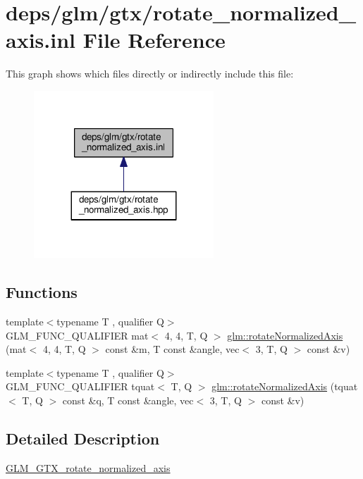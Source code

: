 \hypertarget{rotate__normalized__axis_8inl}{}\section{deps/glm/gtx/rotate\+\_\+normalized\+\_\+axis.inl File Reference}
\label{rotate__normalized__axis_8inl}
This graph shows which files directly or indirectly include this file\+:
\nopagebreak
\begin{figure}[H]
\begin{center}
\leavevmode
\includegraphics[width=191pt]{d0/df2/rotate__normalized__axis_8inl__dep__incl}
\end{center}
\end{figure}
\subsection*{Functions}
\begin{DoxyCompactItemize}
\item 
{\footnotesize template$<$typename T , qualifier Q$>$ }\\G\+L\+M\+\_\+\+F\+U\+N\+C\+\_\+\+Q\+U\+A\+L\+I\+F\+I\+ER mat$<$ 4, 4, T, Q $>$ \hyperlink{group__gtx__rotate__normalized__axis_ga50efd7ebca0f7a603bb3cc11e34c708d}{glm\+::rotate\+Normalized\+Axis} (mat$<$ 4, 4, T, Q $>$ const \&m, T const \&angle, vec$<$ 3, T, Q $>$ const \&v)
\item 
{\footnotesize template$<$typename T , qualifier Q$>$ }\\G\+L\+M\+\_\+\+F\+U\+N\+C\+\_\+\+Q\+U\+A\+L\+I\+F\+I\+ER tquat$<$ T, Q $>$ \hyperlink{group__gtx__rotate__normalized__axis_gad5bb8a155ee52fd349b88cec3a843600}{glm\+::rotate\+Normalized\+Axis} (tquat$<$ T, Q $>$ const \&q, T const \&angle, vec$<$ 3, T, Q $>$ const \&v)
\end{DoxyCompactItemize}


\subsection{Detailed Description}
\hyperlink{group__gtx__rotate__normalized__axis}{G\+L\+M\+\_\+\+G\+T\+X\+\_\+rotate\+\_\+normalized\+\_\+axis} 